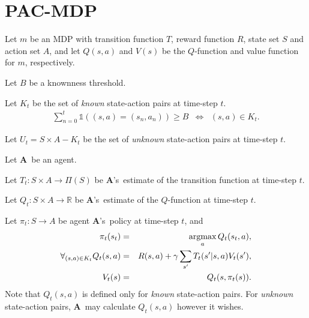\section{PAC-MDP}


\newcommand{\A}{$\mathbf{A}$\ }
\newcommand{\As}{$\mathbf{A}$'s\ }

\begin{defn}
Let $m$ be an MDP with transition function $T$, reward function $R$, state set $S$ and action set $A$, and let $Q(s,a)$ and $V(s)$ be the $Q$-function and value function for $m$, respectively.
\end{defn}

\begin{defn}
Let $B$ be a knownness threshold.
\end{defn}

\begin{defn}
Let $K_t$ be the set of \emph{known} state-action pairs at time-step $t$.
\begin{eqnarray}
\sum_{n=0}^t \mathbb{1}\left((s,a) = (s_n,a_n)\right) \geq B & \Longleftrightarrow & (s,a) \in K_t.
\end{eqnarray}
\end{defn}

\begin{defn}
Let $U_t = S \times A - K_t$ be the set of \emph{unknown} state-action pairs at time-step $t$.
\end{defn}

\begin{defn}
Let \A be an agent.
\end{defn}

\begin{defn}
Let $T_t: S \times A \rightarrow \Pi(S)$ be \As estimate of the transition function at time-step $t$.
\end{defn}

\begin{defn}
Let $Q_t: S \times A \rightarrow \mathbb{R}$ be \As estimate of the $Q$-function at time-step $t$.
\end{defn}

\begin{defn}
Let $\pi_t: S \rightarrow A$ be agent \As policy at time-step $t$, and 
\begin{eqnarray}
\pi_t(s_t) &=& \argmax_a Q_t(s_t,a),\\
\forall_{(s,a)\in K_t} Q_t(s,a) &=& R(s,a) + \gamma \sum_{s'} T_t(s'|s,a) V_t(s'),\\
V_t(s) &=& Q_t(s,\pi_t(s)).
\end{eqnarray}
Note that $Q_t(s,a)$ is defined only for \emph{known} state-action pairs. For \emph{unknown} state-action pairs, \A may calculate $Q_t(s,a)$ however it wishes.
\end{defn}

